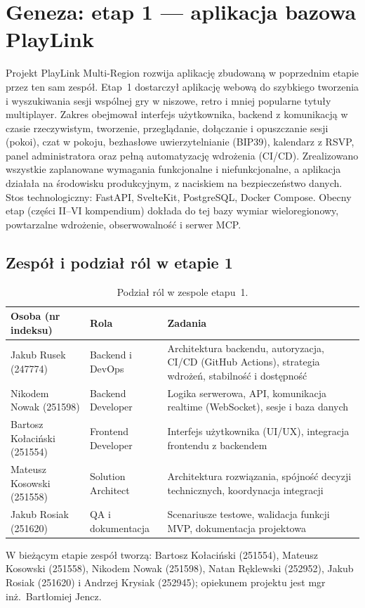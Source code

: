 
\chapter{Geneza: etap 1 --- aplikacja bazowa PlayLink}\label{ch:real-geneza}

Projekt PlayLink Multi-Region rozwija aplikację zbudowaną w poprzednim etapie przez ten sam zespół.
Etap~1 dostarczył aplikację webową do szybkiego tworzenia i wyszukiwania sesji wspólnej gry w niszowe,
retro i mniej popularne tytuły multiplayer. Zakres obejmował interfejs użytkownika, backend z komunikacją
w czasie rzeczywistym, tworzenie, przeglądanie, dołączanie i opuszczanie sesji (pokoi), czat w pokoju,
bezhasłowe uwierzytelnianie (BIP39), kalendarz z RSVP, panel administratora oraz pełną automatyzację
wdrożenia (CI/CD). Zrealizowano wszystkie zaplanowane wymagania funkcjonalne i niefunkcjonalne, a aplikacja
działała na środowisku produkcyjnym, z naciskiem na bezpieczeństwo danych. Stos technologiczny: FastAPI,
SvelteKit, PostgreSQL, Docker Compose. Obecny etap (części II--VI kompendium) dokłada do tej bazy wymiar
wieloregionowy, powtarzalne wdrożenie, obserwowalność i serwer MCP.

\section{Zespół i podział ról w etapie 1}
\begin{table}[H]
\centering\small
\renewcommand{\arraystretch}{1.25}
\begin{tabularx}{\textwidth}{@{}p{}p{}Y@{}}
\toprule
\textbf{Osoba (nr indeksu)} & \textbf{Rola} & \textbf{Zadania} \\
\midrule
Jakub Rusek (247774) & Backend i DevOps & Architektura backendu, autoryzacja, CI/CD (GitHub Actions), strategia wdrożeń, stabilność i dostępność \\
Nikodem Nowak (251598) & Backend Developer & Logika serwerowa, API, komunikacja realtime (WebSocket), sesje i baza danych \\
Bartosz Kołaciński (251554) & Frontend Developer & Interfejs użytkownika (UI/UX), integracja frontendu z backendem \\
Mateusz Kosowski (251558) & Solution Architect & Architektura rozwiązania, spójność decyzji technicznych, koordynacja integracji \\
Jakub Rosiak (251620) & QA i dokumentacja & Scenariusze testowe, walidacja funkcji MVP, dokumentacja projektowa \\
\bottomrule
\end{tabularx}
\caption{Podział ról w zespole etapu~1.}
\end{table}
W bieżącym etapie zespół tworzą: Bartosz Kołaciński (251554), Mateusz Kosowski (251558), Nikodem Nowak
(251598), Natan Ręklewski (252952), Jakub Rosiak (251620) i Andrzej Krysiak (252945); opiekunem projektu
jest mgr inż.\ Bartłomiej Jencz.

